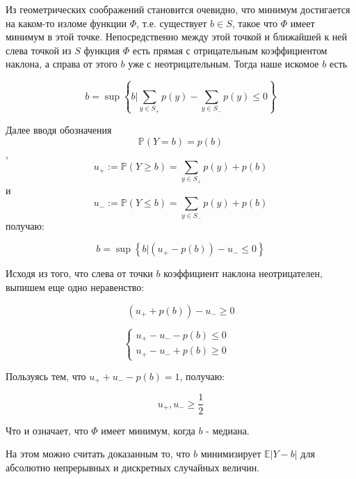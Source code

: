\documentclass[12pt]{article}
\begin{document}
Из геометрических соображений становится очевидно, что минимум достигается на каком-то изломе функции $\Phi$, т.е. существует $b\in S$, такое что $\Phi$ имеет минимум в этой точке. Непосредственно между этой точкой и ближайшей к ней слева точкой из $S$ функция $\Phi$ есть прямая с отрицательным коэффициентом наклона, а справа от этого $b$ уже с неотрицательным. Тогда наше искомое $b$ есть

$$b = \sup\left\{b|\sum\limits_{y \in S_+}p(y) - \sum\limits_{y \in S_-}p(y)\leq 0\right\}$$

Далее вводя обозначения $$\mathbb{P}(Y=b)=p(b)$$, $$u_+ := \mathbb{P}(Y\geq b) =\sum\limits_{y \in S_+}p(y) + p(b)$$ и $$u_- := \mathbb{P}(Y\leq b) =\sum\limits_{y \in S_-}p(y) + p(b)$$ получаю:

$$b = \sup\left\{b|(u_+ - p(b))-u_-\leq 0\right\}$$

Исходя из того, что слева от точки $b$ коэффициент наклона неотрицателен, выпишем еще одно неравенство:

$$(u_+ + p(b))-u_-\geq 0$$

\begin{equation*}
 \begin{cases}
   u_+-u_--p(b)\leq 0 &\\
   u_+-u_-+p(b)\geq 0 &
 \end{cases}
\end{equation*}

Пользуясь тем, что $u_++u_--p(b) = 1$, получаю:

$$u_+,u_-\geq\frac{1}{2}$$

Что и означает, что $\Phi$ имеет минимум, когда $b$ - медиана.

На этом можно считать доказанным то, что $b$ минимизирует $\mathbb{E}|Y-b|$ для абсолютно непрерывных и дискретных случайных величин.
\end{document}
